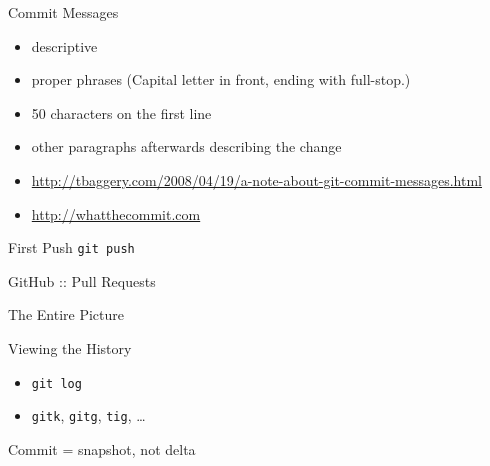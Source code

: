\documentclass{beamer}
\begin{document}
\begin{frame}{Commit Messages}
  \begin{itemize}
    \item descriptive
    \item proper phrases (Capital letter in front, ending with full-stop.)
    \item 50 characters on the first line
    \item other paragraphs afterwards describing the change
    \scriptsize
    \item
      \url{http://tbaggery.com/2008/04/19/a-note-about-git-commit-messages.html}
    \normalsize
    \item \url{http://whatthecommit.com}
  \end{itemize}
  \begin{center}
  \end{center}
\end{frame}

\begin{frame}{First Push}
  \texttt{git push}
  \begin{center}
  \end{center}
\end{frame}

\begin{frame}{GitHub :: Pull Requests}
  \begin{center}
  \end{center}
\end{frame}

\begin{frame}{The Entire Picture}
  \begin{center}
  \end{center}
\end{frame}

\begin{frame}{Viewing the History}
  \begin{itemize}
    \item \texttt{git log}
    \item \texttt{gitk}, \texttt{gitg}, \texttt{tig}, \ldots
  \end{itemize}
\end{frame}

\begin{frame}{Commit = snapshot, not delta}
  \begin{center}
  \end{center}
\end{frame}
\end{document}
